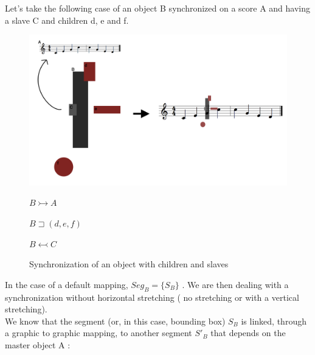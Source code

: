 \documentclass[a4paper]{article}
\newcommand{\parent}			{\sqsupset}
\newcommand{\master}			{\leftarrowtail}
\newcommand{\slave}			{\rightarrowtail}
\begin{document}
Let's take the following case of an object B synchronized on a score A and having a slave C and children d, e and f. 
\\
\begin{figure}[h]
\begin{center}
\includegraphics[width=14cm]{img/score-final3.png}   	            

\end{center}

 $B \slave A$

 $B \parent (d, e, f)$

 $B \master C$
\caption{Synchronization of an object with children and slaves}
\label{fig:defaultMap}
\end{figure}

\bigskip

In the case of a default mapping, $Seg_B = \{S_B\}$ . We are then dealing with a synchronization without horizontal stretching ( no stretching or with a vertical stretching). 
\\

We know that the segment (or, in this case, bounding box) $S_B$ is linked, through a graphic to graphic mapping, to another segment $S'_B$ that depends on the master object A : 
\end{document}

